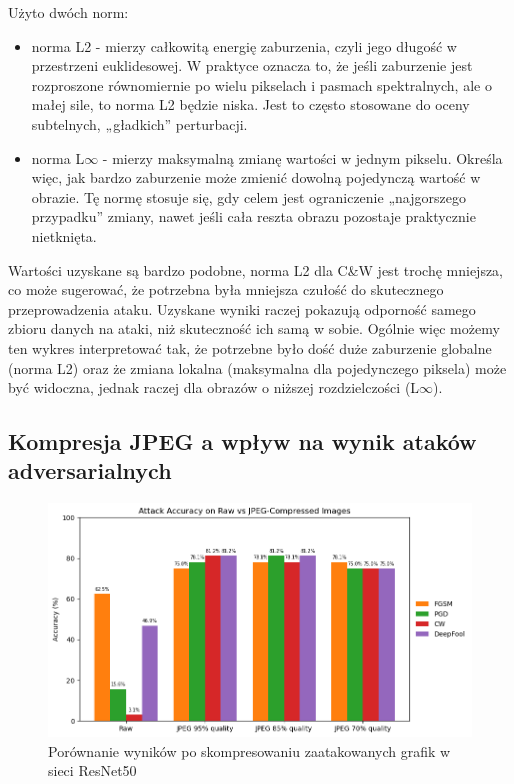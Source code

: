 \documentclass[12pt]{article}
\begin{document}
Użyto dwóch norm:
\begin{itemize}
    \item norma L2 - mierzy całkowitą energię zaburzenia, czyli jego długość w przestrzeni euklidesowej. W praktyce oznacza to, że jeśli zaburzenie jest rozproszone równomiernie po wielu pikselach i pasmach spektralnych, ale o małej sile, to norma L2 będzie niska. Jest to często stosowane do oceny subtelnych, „gładkich” perturbacji.
    \item norma L$\infty$ - mierzy maksymalną zmianę wartości w jednym pikselu. Określa więc, jak bardzo zaburzenie może zmienić dowolną pojedynczą wartość w obrazie. Tę normę stosuje się, gdy celem jest ograniczenie „najgorszego przypadku” zmiany, nawet jeśli cała reszta obrazu pozostaje praktycznie nietknięta.
\end{itemize}
Wartości uzyskane są bardzo podobne, norma L2 dla C\&W jest trochę mniejsza, co może sugerować, że potrzebna była mniejsza czułość do skutecznego przeprowadzenia ataku. Uzyskane wyniki raczej pokazują odporność samego zbioru danych na ataki, niż skuteczność ich samą w sobie. Ogólnie więc możemy ten wykres interpretować tak, że potrzebne było dość duże zaburzenie globalne (norma L2) oraz że zmiana lokalna (maksymalna dla pojedynczego piksela) może być widoczna, jednak raczej dla obrazów o niższej rozdzielczości (L$\infty$).

\subsection{Kompresja JPEG a wpływ na wynik ataków adversarialnych}

\begin{figure} [H]
    \centering
    \includegraphics[width=1\textwidth]{jpeg_accuracy.png}
    \caption{Porównanie wyników po skompresowaniu zaatakowanych grafik w sieci ResNet50}
    \label{fig:enter-label}
\end{figure}
\end{document}
